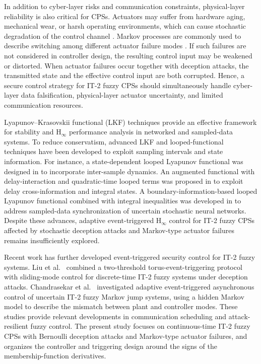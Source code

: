 \documentclass[preprint,review,fleqn,sort&compress,3p]{elsarticle}
\theoremstyle{definition} %
\theoremstyle{definition}%
\begin{document}
In addition to cyber-layer risks and communication constraints, physical-layer
reliability is also critical for CPSs. Actuators may suffer from hardware aging,
mechanical wear, or harsh operating environments, which can cause stochastic
degradation of the control channel
\cite{chenProbabilisticEventTriggeredPolicy2023,caiAdaptiveFaulttolerantControl2025}.
Markov processes are commonly used to describe switching among different actuator
failure modes \cite{yaoMultiSensorBasedSwitchingEventTriggered2024,xuAsynchronousEventTriggeredControl2024}.
If such failures are not considered in controller design, the resulting control
input may be weakened or distorted. When actuator failures occur together with
deception attacks, the
transmitted state and the effective control input are both corrupted. Hence, a
secure control strategy for IT-2 fuzzy CPSs should simultaneously handle
cyber-layer data falsification, physical-layer actuator uncertainty, and limited
communication resources.

Lyapunov--Krasovskii functional (LKF) techniques provide an effective framework for stability and $\mathrm{H}_\infty$ performance analysis in networked and sampled-data systems. To reduce conservatism, advanced LKF and looped-functional techniques
have been developed to exploit sampling intervals and state information. For
instance, a state-dependent looped Lyapunov functional was designed in
\cite{lianNewResultsStability2020} to incorporate inter-sample dynamics. An
augmented functional with delay-interaction and quadratic-time looped terms was
proposed in \cite{zhangMixedDelayBasedAugmentedFunctional2024} to exploit delay
cross-information and integral states. A boundary-information-based looped
Lyapunov functional combined with integral inequalities was developed in
\cite{ganesanSynchronizationStochasticNeural2024} to address sampled-data synchronization of uncertain stochastic neural networks. Despite these advances, adaptive event-triggered $\mathrm{H}_\infty$ control for IT-2 fuzzy CPSs affected by stochastic deception attacks and Markov-type actuator failures remains insufficiently explored.

Recent work has further developed event-triggered security control for IT-2 fuzzy systems. Liu et al.\ \cite{liuTorusEventBased2025} combined a two-threshold torus-event-triggering protocol with sliding-mode control for discrete-time IT-2 fuzzy systems under deception attacks. Chandrasekar et al.\ \cite{chandrasekarAdaptiveEvent2026} investigated adaptive event-triggered asynchronous control of uncertain IT-2 fuzzy Markov jump systems, using a hidden Markov model to describe the mismatch between plant and controller modes. These studies provide relevant developments in communication scheduling and attack-resilient fuzzy control. The present study focuses on continuous-time IT-2 fuzzy CPSs with Bernoulli deception attacks and Markov-type actuator failures, and organizes the controller and triggering design around the signs of the membership-function derivatives.
\end{document}
